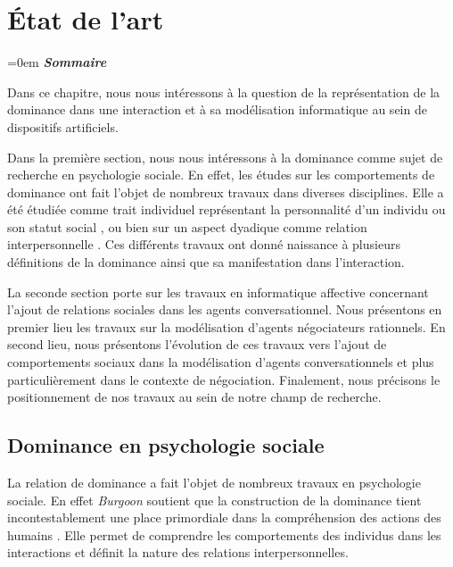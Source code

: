 	\chapter{État de l'art }
	\label{chap:etat}
	
	\begingroup
	\parindent=0em
	\emph{\textbf{Sommaire}}
	 \localtableofcontents 
	\clearpage
	\endgroup
	
	
	Dans ce chapitre, nous nous intéressons à la question de la représentation de la dominance dans une interaction et à sa modélisation informatique au sein de dispositifs artificiels.
	
	Dans la première section, nous nous intéressons à la dominance comme sujet de recherche en psychologie sociale. En effet, les études sur les comportements de dominance ont fait l'objet de nombreux travaux dans diverses disciplines. Elle a été étudiée comme trait individuel représentant la personnalité d'un individu \cite{emmons1991personal} ou son statut social \cite{liska1990dominance}, ou bien sur un aspect dyadique comme relation interpersonnelle \cite{burgoon2006nonverbal}. Ces différents travaux ont donné naissance à plusieurs définitions de la dominance ainsi que sa manifestation dans l'interaction.
	
	La seconde section porte sur les travaux en informatique affective concernant l'ajout de relations sociales dans les agents conversationnel. Nous présentons en premier lieu les travaux sur la modélisation d'agents négociateurs rationnels. En second lieu, nous présentons l'évolution de ces travaux vers l'ajout de comportements sociaux dans la modélisation d'agents conversationnels et plus particulièrement dans le contexte de négociation. Finalement, nous précisons le positionnement de nos travaux au sein de notre champ de recherche.
	
	\section{Dominance en psychologie sociale}
		La relation de dominance a fait l'objet de nombreux travaux en psychologie sociale. En effet \emph{Burgoon} soutient que la construction de la dominance tient incontestablement une place primordiale dans la compréhension des actions des humains \cite{burgoon1995interpersonal}. Elle permet de comprendre les comportements des individus dans les interactions et définit la nature des relations interpersonnelles. 
		
